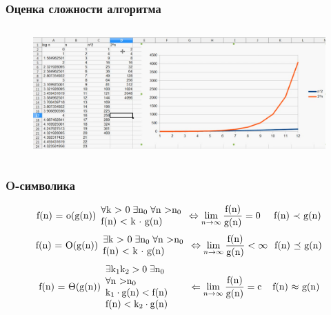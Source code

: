 \documentclass[russian, 12pt]{beamer}
\begin{document}
\begin{frame}
\frametitle{Оценка сложности алгоритма}
\begin{figure}
  \includegraphics[width=\linewidth, height=5cm]{img/scal_4.png}
\end{figure}
\end{frame}
\begin{frame}
\frametitle{O-символика}
\begin{equation*}
\text{f(n) = o(g(n))}
  \begin{array}{l}
  \forall\text{k > 0}\;\exists\text{n}_0\;  \forall \text{n >}\text{n}_0  \\
  \text{f(n) < k $\cdot$ g(n)}
  \end{array}
\Leftrightarrow
\lim_{n\rightarrow\infty}\frac{\text{f(n)}}{\text{g(n)}}=\text{0}
\hspace{0.49cm}
\text{f(n) $\prec$ g(n)}
\end{equation*}
\vspace{0.3cm}
\begin{equation*}
\text{f(n) = O(g(n))}
  \begin{array}{l}
    \exists\text{k > 0}\;\exists\text{n}_0\;  \forall \text{n >}\text{n}_0  \\
    \text{f(n) < k $\cdot$ g(n)}
  \end{array}
\Leftrightarrow
\lim_{n\rightarrow\infty}\frac{\text{f(n)}}{\text{g(n)}}<\infty
\hspace{0.25cm}
\text{f(n) $\preceq$ g(n)}
\end{equation*}
\vspace{0.3cm}
\begin{equation*}
\text{f(n) = $\Theta$(g(n))}
  \begin{array}{l}
    \exists\text{k}_1\text{k}_2 >\text{0}\;\exists\text{n}_0\hspace{0.5cm}\\
    \forall \text{n >}\text{n}_0\\
    \text{k}_1 \cdot \text{g(n)} < \text{f(n)}\\
    \text{f(n)} < \text{k}_2 \cdot \text{g(n)}
  \end{array}
\hspace{0.2cm}
\Leftarrow
\lim_{n\rightarrow\infty}\frac{\text{f(n)}}{\text{g(n)}}=\text{c}
\hspace{0.4cm}
\text{f(n) $\approx$ g(n)}
\end{equation*}
\end{frame}
\end{document}
